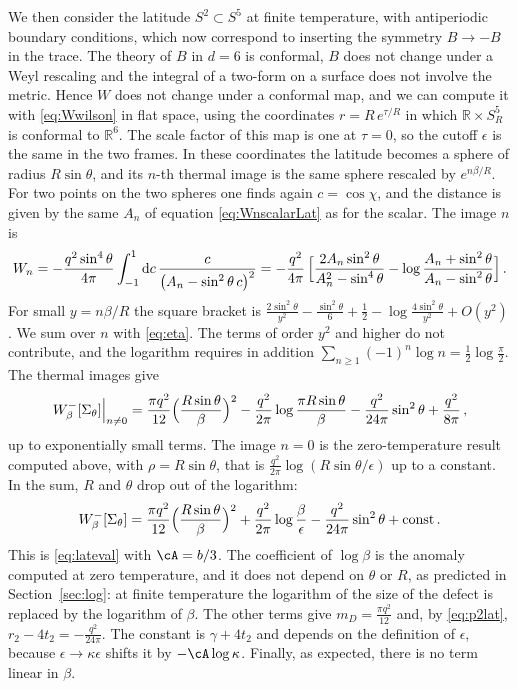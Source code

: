 \documentclass[a4paper,11pt]{article}
\newcommand{\dd}{\mathrm{d}}
\begin{document}
	We then consider the latitude $S^2\subset S^5$ at finite temperature, with antiperiodic boundary conditions, which now correspond to inserting the symmetry $B\to-B$ in the trace. The theory of $B$ in $d=6$ is conformal, $B$ does not change under a Weyl rescaling and the integral of a two-form on a surface does not involve the metric. Hence $W$ does not change under a conformal map, and we can compute it with \eqref{eq:Wwilson} in flat space, using the coordinates $r=R\,e^{\tau/R}$ in which $\mathbb{R}\times S^5_R$ is conformal to $\mathbb{R}^6$. The scale factor of this map is one at $\tau=0$, so the cutoff $\epsilon$ is the same in the two frames. In these coordinates the latitude becomes a sphere of radius $R\sin\theta$, and its $n$-th thermal image is the same sphere rescaled by $e^{n\beta/R}$. For two points on the two spheres one finds again $c=\cos\chi$, and the distance is given by the same $A_n$ of equation \eqref{eq:WnscalarLat} as for the scalar. The image $n$ is
	\begin{equation}
		W_n=-\frac{q^2\sin^4\theta}{4\pi}\int_{-1}^1\dd c\,\frac{c}{\bigl(A_n-\sin^2\theta\,c\bigr)^2}
		=-\frac{q^2}{4\pi}\,\Bigl[\frac{2A_n\sin^2\theta}{A_n^2-\sin^4\theta}-\log\frac{A_n+\sin^2\theta}{A_n-\sin^2\theta}\Bigr]\, .
	\end{equation}
	For small $y=n\beta/R$ the square bracket is $\tfrac{2\sin^2\theta}{y^2}-\tfrac{\sin^2\theta}{6}+\tfrac12-\log\tfrac{4\sin^2\theta}{y^2}+O(y^2)$. We sum over $n$ with \eqref{eq:eta}. The terms of order $y^2$ and higher do not contribute, and the logarithm requires in addition $\sum_{n\ge1}(-1)^n\log n=\tfrac12\log\tfrac\pi2$. The thermal images give
	\begin{equation}\label{eq:wilsonth}
		W^-_\beta[\Sigma_\theta]\Big|_{n\neq0}=\frac{\pi q^2}{12}\Bigl(\frac{R\sin\theta}{\beta}\Bigr)^{2}-\frac{q^2}{2\pi}\log\frac{\pi R\sin\theta}{\beta}-\frac{q^2}{24\pi}\sin^2\theta+\frac{q^2}{8\pi}\, ,
	\end{equation}
	up to exponentially small terms. The image $n=0$ is the zero-temperature result computed above, with $\rho=R\sin\theta$, that is $\tfrac{q^2}{2\pi}\log(R\sin\theta/\epsilon)$ up to a constant. In the sum, $R$ and $\theta$ drop out of the logarithm:
	\begin{equation}\label{eq:tflat}
		W^-_\beta[\Sigma_\theta]=\frac{\pi q^2}{12}\Bigl(\frac{R\sin\theta}{\beta}\Bigr)^{2}+\frac{q^2}{2\pi}\log\frac{\beta}{\epsilon}-\frac{q^2}{24\pi}\sin^2\theta+\text{const}\, .
	\end{equation}
	This is \eqref{eq:lateval} with $\cA=b/3$. The coefficient of $\log\beta$ is the anomaly computed at zero temperature, and it does not depend on $\theta$ or $R$, as predicted in Section~\ref{sec:log}: at finite temperature the logarithm of the size of the defect is replaced by the logarithm of $\beta$. The other terms give $m_D=\tfrac{\pi q^2}{12}$ and, by \eqref{eq:p2lat}, $r_2-4t_2=-\tfrac{q^2}{24\pi}$. The constant is $\gamma+4t_2$ and depends on the definition of $\epsilon$, because $\epsilon\to\kappa\epsilon$ shifts it by $-\cA\log\kappa$. Finally, as expected, there is no term linear in $\beta$.
\end{document}
